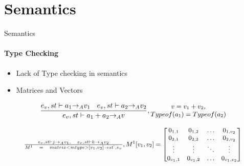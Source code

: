 \section{Semantics}

\begin{frame}{Semantics}
\framesubtitle{Type Checking}

\begin{itemize}
  \item Lack of Type checking in semantics
  \item Matrices and Vectors
\end{itemize}

\begin{equation}
\small
\frac { { e }_{ v },st\vdash { a }_{ 1 }{ \rightarrow  }_{ A }{ v }_{ 1 }\quad { e }_{ v },st\vdash { a }_{ 2 }{ \rightarrow  }_{ A }{ v }_{ 2 } }{ { e }_{ v },st\vdash { a }_{ 1 }+{ a }_{ 2 }{ \rightarrow  }_{ A }{ v } } ,\begin{matrix} v={ v }_{ 1 }+{ v }_{ 2 }, \\ Typeof({ a }_{ 1 }) = Typeof({ a }_{ 2 }) \end{matrix}
\end{equation}

\begin{equation}
\resizebox{.9\textwidth}{!}{

\small
    $\frac { { e }_{ v },st\vdash j{ \rightarrow  }_{ A }{ v }_{ 1 },\quad { e }_{ v },st\vdash k{ \rightarrow  }_{ A }{ v }_{ 2 } }{ { M }^{ 1 }\quad =\quad matrix<mtype>[{ v }_{ 1 },{ v }_{ 2 }]\rightarrow { st }^{ ` },{ e }_{ v } }  ,{ M }^{ 1 }[{ v }_{ 1 },{ v }_{ 2 }]= \begin{bmatrix} { { 0 }_{ 1,1 } } & 0_{ 1,2 } & \dots  & { 0 }_{ { 1,{ v }_{ 2 } } } \\ 0_{ 2,1 } & 0_{ 2,2 } & \dots  & 0_{ 2,v_{ 2 } } \\ \vdots  & \vdots  & \ddots  & \vdots  \\ { 0 }_{ { v }_{ 1 },1 } & 0_{ v_{ 1 },2 } & \dots  & { 0 }_{ { v }_{ 1 },{ v }_{ 2 } } \end{bmatrix}$
    }
\end{equation}

\end{frame}

